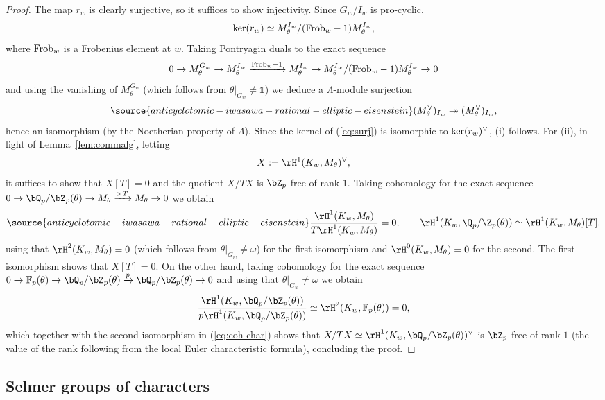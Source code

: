 \begin{proof}
The map $r_w$ is clearly surjective, so it suffices to show injectivity. Since $G_w/I_w$ is pro-cyclic,
\[
{\rm ker}(r_w)\simeq M_\theta^{I_w}/({\rm Frob}_w-1)M_\theta^{I_w},
\]
where ${\rm Frob}_w$ is a Frobenius element at $w$. Taking Pontryagin duals to the exact sequence
\[
0\rightarrow M_\theta^{G_w}\rightarrow M_\theta^{I_w}\xrightarrow{{\rm Frob}_w-1}M_\theta^{I_w}\rightarrow M_\theta^{I_w}/({\rm Frob}_w-1)M_\theta^{I_w}\rightarrow 0
\]
and using the vanishing of $M_\theta^{G_w}$ (which follows from $\theta\vert_{G_w}\neq\mathds{1}$) we deduce a $\Lambda$-module surjection
\begin{equation}\label{eq:surj}
\source{anticyclotomic-iwasawa-rational-elliptic-eisenstein}
(M_\theta^\vee)_{I_w}\twoheadrightarrow(M_\theta^\vee)_{I_w},
\end{equation}
hence an isomorphism (by the Noetherian property of $\Lambda$).
Since the kernel of (\ref{eq:surj}) is isomorphic to ${\rm ker}(r_w)^\vee$, (i)  follows. For (ii), in light of Lemma~\ref{lem:commalg}, letting
\[
X:=\rH^1(K_w,M_\theta)^\vee,
\]
it suffices to show that $X[T]=0$ and the quotient $X/TX$ is $\bZ_p$-free of rank $1$. Taking cohomology for the exact sequence $0\rightarrow\bQ_p/\bZ_p(\theta)\rightarrow M_{\theta}\xrightarrow{\times T}M_{\theta}\rightarrow 0$ we obtain
\begin{equation}\label{eq:coh-char}
\source{anticyclotomic-iwasawa-rational-elliptic-eisenstein}
\frac{\rH^1(K_w,M_{\theta})}{T\rH^1(K_w,M_{\theta})}=0,\quad
\quad\rH^1(K_w,\Q_p/\Z_p(\theta))\simeq\rH^1(K_w,M_{\theta})[T],
\end{equation}
using that $\rH^2(K_w,M_\theta)=0$ (which follows from $\theta|_{G_w} \neq \omega$)
for the first isomorphism and
$\rH^0(K_w,M_{\theta})=0$ for the second. The first isomorphism shows that $X[T]=0$. On the other hand, taking cohomology for the exact sequence $0\rightarrow\mathbb{F}_p(\theta)\rightarrow\bQ_p/\bZ_p(\theta)\xrightarrow{p}\bQ_p/\bZ_p(\theta)\rightarrow 0$ and using that $\theta\vert_{G_w}\neq\omega$ we obtain
\[
\frac{\rH^1(K_w,\bQ_p/\bZ_p(\theta))}{p\rH^1(K_w,\bQ_p/\bZ_p(\theta))}\simeq\rH^2(K_w,\mathbb{F}_p(\theta))=0,
\]
which together with the second isomorphism in (\ref{eq:coh-char}) shows that $X/TX\simeq\rH^1(K_w,\bQ_p/\bZ_p(\theta))^\vee$ is $\bZ_p$-free of rank $1$ (the value of the rank following from the local Euler characteristic formula), concluding the proof.
\end{proof}


\subsection{Selmer groups of characters}
\label{subsec:Sel-char}

